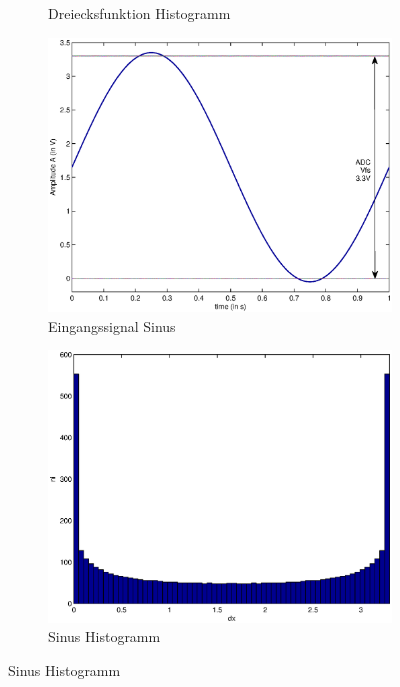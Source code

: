 \documentclass[TGAI_Laborbericht.tex]{subfiles}
\begin{document}
\begin{figure}[!ht]
\begin{subfigure}{.499\textwidth}
		\caption{Dreiecksfunktion Histogramm}
		\label{fig:GRUNDL_RAMP_HIST_3X3}
	\end{subfigure}
	\begin{subfigure}{.499\textwidth}
		\centering\small
		\includegraphics[width=\textwidth]{media/matlab/HISTOGRAM/sin_fkt_samples_5000.eps}
		\caption{Eingangssignal Sinus}
		\label{fig:GRUNDL_SIN_SIN_3X3}
	\end{subfigure}%
	\begin{subfigure}{.499\textwidth}
		\centering\small
		\includegraphics[width=\textwidth]{media/matlab/HISTOGRAM/sin_hist_samples_5000.eps}
		\caption{Sinus Histogramm}

\end{subfigure}
\end{figure}
\end{document}
